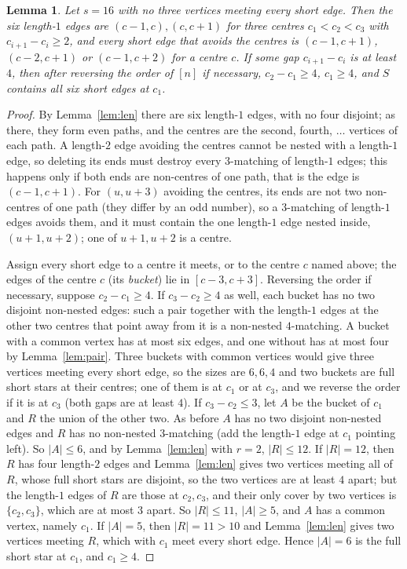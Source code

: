 \documentclass[11pt]{amsart}
\newtheorem{lemma}[theorem]{Lemma}
\theoremstyle{definition}\newtheorem{problem}{Problem}
\theoremstyle{remark}\newtheorem*{remark}{Remark}
\begin{document}
\begin{lemma}\label{lem:uncov}
Let $s=16$ with no three vertices meeting every short edge. Then the six length-$1$ edges are $(c-1,c),(c,c+1)$ for
three \emph{centres} $c_1<c_2<c_3$ with $c_{i+1}-c_i\ge2$, and every short edge that avoids the centres is
$(c-1,c+1)$, $(c-2,c+1)$ or $(c-1,c+2)$ for a centre $c$. If some gap $c_{i+1}-c_i$ is at least $4$, then after
reversing the order of $[n]$ if necessary, $c_2-c_1\ge4$, $c_1\ge4$, and $S$ contains all six short edges at $c_1$.
\end{lemma}

\begin{proof}
By Lemma~\ref{lem:len} there are six length-$1$ edges, with no four disjoint; as there, they form even paths, and the
centres are the second, fourth, $\dots$ vertices of each path. A length-$2$ edge avoiding the centres cannot be nested
with a length-$1$ edge, so deleting its ends must destroy every $3$-matching of length-$1$ edges; this happens only if
both ends are non-centres of one path, that is the edge is $(c-1,c+1)$. For $(u,u+3)$ avoiding the centres, its ends
are not two non-centres of one path (they differ by an odd number), so a $3$-matching of length-$1$ edges avoids them,
and it must contain the one length-$1$ edge nested inside, $(u+1,u+2)$; one of $u+1,u+2$ is a centre.

Assign every short edge to a centre it meets, or to the centre $c$ named above; the edges of the centre $c$ (its
\emph{bucket}) lie in $[c-3,c+3]$. Reversing the order if necessary, suppose $c_2-c_1\ge4$. If $c_3-c_2\ge4$ as
well, each bucket has no two disjoint
non-nested edges: such a pair together with the length-$1$ edges at the other two centres that point away from it is a
non-nested $4$-matching. A bucket with a common vertex has at most six edges, and one without has at most four by
Lemma~\ref{lem:pair}. Three buckets with common vertices would give three vertices meeting every short edge, so the
sizes are $6,6,4$ and two buckets are full short stars at their centres; one of them is at $c_1$ or at $c_3$, and
we reverse the order if it is at $c_3$ (both gaps are at least $4$). If $c_3-c_2\le3$, let $A$ be
the bucket of $c_1$ and $R$ the union of the other two. As before $A$ has no two disjoint non-nested edges and $R$ has
no non-nested $3$-matching (add the length-$1$ edge at $c_1$ pointing left). So $|A|\le6$, and by
Lemma~\ref{lem:len} with $r=2$, $|R|\le12$. If $|R|=12$, then $R$ has four length-$2$ edges and Lemma~\ref{lem:len}
gives two vertices meeting all of $R$, whose full short stars are disjoint, so the two vertices are at least $4$ apart;
but the length-$1$ edges of $R$ are those at $c_2,c_3$, and their only cover by two vertices is $\{c_2,c_3\}$, which
are at most $3$ apart. So $|R|\le11$, $|A|\ge5$, and $A$ has a common vertex, namely $c_1$. If $|A|=5$, then $|R|=11>10$
and Lemma~\ref{lem:len} gives two vertices meeting $R$, which with $c_1$ meet every short edge. Hence $|A|=6$ is the
full short star at $c_1$, and $c_1\ge4$.
\end{proof}
\end{document}
